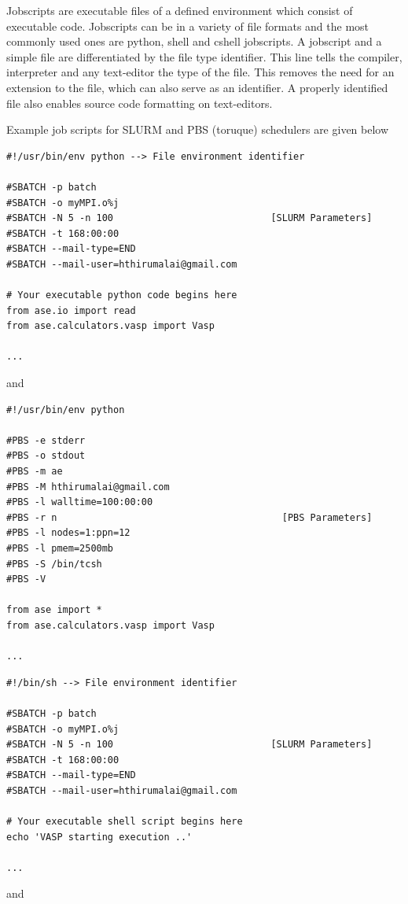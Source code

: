 \documentclass[11pt]{article}
\begin{document}
Jobscripts are executable files of a defined environment which consist
of executable code. Jobscripts can be in a variety of file formats and
the most commonly used ones are python, shell and cshell jobscripts. A
jobscript and a simple file are differentiated by the file type
identifier. This line tells the compiler, interpreter and any
text-editor the type of the file. This removes the need for an extension
to the file, which can also serve as an identifier. A properly
identified file also enables source code formatting on text-editors.

Example job scripts for SLURM and PBS (toruque) schedulers are given
below

    \begin{verbatim}
#!/usr/bin/env python --> File environment identifier

#SBATCH -p batch
#SBATCH -o myMPI.o%j
#SBATCH -N 5 -n 100                            [SLURM Parameters]
#SBATCH -t 168:00:00
#SBATCH --mail-type=END
#SBATCH --mail-user=hthirumalai@gmail.com

# Your executable python code begins here
from ase.io import read
from ase.calculators.vasp import Vasp

...
\end{verbatim}

and

\begin{verbatim}
#!/usr/bin/env python

#PBS -e stderr
#PBS -o stdout
#PBS -m ae
#PBS -M hthirumalai@gmail.com
#PBS -l walltime=100:00:00
#PBS -r n                                        [PBS Parameters]
#PBS -l nodes=1:ppn=12
#PBS -l pmem=2500mb
#PBS -S /bin/tcsh
#PBS -V

from ase import *
from ase.calculators.vasp import Vasp

...
\end{verbatim}

    \begin{verbatim}
#!/bin/sh --> File environment identifier

#SBATCH -p batch
#SBATCH -o myMPI.o%j
#SBATCH -N 5 -n 100                            [SLURM Parameters]
#SBATCH -t 168:00:00
#SBATCH --mail-type=END
#SBATCH --mail-user=hthirumalai@gmail.com

# Your executable shell script begins here
echo 'VASP starting execution ..'

...
\end{verbatim}

and
\end{document}

